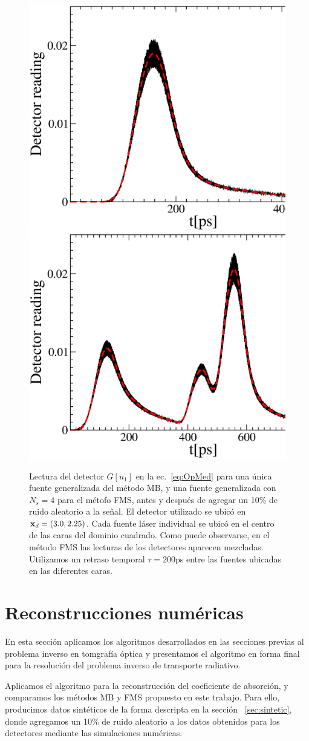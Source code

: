 \begin{figure}[h!]
\centering
  \includegraphics[width=0.48\linewidth]{figuras/detread_sweep.eps}
  \includegraphics[width=0.48\linewidth]{figuras/detread_prop.eps}
  \caption{Lectura del detector $G[u_1]$ en la ec.~\eqref{eq:OpMed} para 
  una única fuente generalizada del método MB, y una fuente generalizada con 
  $N_s=4$ para el métofo FMS, antes y después de agregar un 10\% de ruido aleatorio 
  a la señal. El detector utilizado se ubicó en  $\mathbf{x}_d=(3.0,2.25)$. Cada fuente 
  láser individual se ubicó en el centro de las caras del dominio cuadrado. 
  Como puede observarse, en el método FMS las lecturas de los detectores 
  aparecen mezcladas. Utilizamos un retraso temporal  $\tau=200$ps entre las fuentes 
  ubicadas en las diferentes caras.}
 \label{fig:detread}
\end{figure}

\section{Reconstrucciones numéricas}
\label{sec:inverseres}

En esta sección aplicamos los algoritmos desarrollados 
en las secciones previas al problema inverso en tomgrafía óptica 
y presentamos el algoritmo en forma final para la resolución 
del problema inverso de transporte radiativo. 

Aplicamos el algoritmo para la reconstrucción del coeficiente 
de absorción, y comparamos los métodos MB y FMS propuesto en este trabajo. 
Para ello, producimos datos sintéticos de la forma descripta en la sección~
\ref{sec:sintetic}, donde agregamos un 10\% de ruido aleatorio a los datos obtenidos 
para los detectores 
mediante las simulaciones numéricas.

